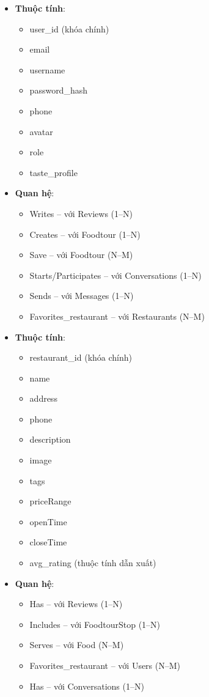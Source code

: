 \begin{itemize}[label=\textbullet]
    \item \textbf{Thuộc tính}:
    \begin{itemize}
        \item user\_id (khóa chính)
        \item email
        \item username
        \item password\_hash
        \item phone
        \item avatar
        \item role
        \item taste\_profile
    \end{itemize}
    \item \textbf{Quan hệ}:
    \begin{itemize}
        \item Writes – với Reviews (1--N)
        \item Creates – với Foodtour (1--N)
        \item Save – với Foodtour (N--M)
        \item Starts/Participates -- với Conversations (1--N)
        \item Sends -- với Messages (1--N)
        \item Favorites\_restaurant – với Restaurants (N--M)
    \end{itemize}
\end{itemize}

\begin{itemize}[label=\textbullet]
    \item \textbf{Thuộc tính}:
    \begin{itemize}
        \item restaurant\_id (khóa chính)
        \item name
        \item address
        \item phone
        \item description
        \item image
        \item tags
        \item priceRange
        \item openTime
        \item closeTime
        \item avg\_rating (thuộc tính dẫn xuất)
    \end{itemize}
    \item \textbf{Quan hệ}:
    \begin{itemize}
        \item Has – với Reviews (1--N)
        \item Includes – với FoodtourStop (1--N)
        \item Serves – với Food (N--M)
        \item Favorites\_restaurant – với Users (N--M)
        \item Has -- với Conversations (1--N)
    \end{itemize}
\end{itemize}


